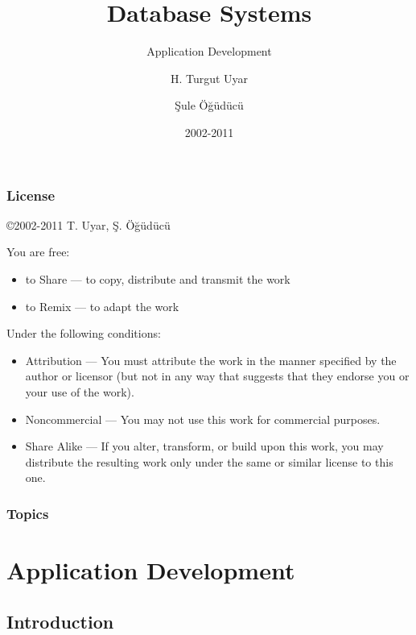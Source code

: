 \documentclass[dvipsnames]{beamer}
\title{Database Systems}
\subtitle{Application Development}
\author{H. Turgut Uyar \and Şule Öğüdücü}
\date{2002-2011}
\theoremstyle{plain}
\begin{document}
\begin{frame}
  \titlepage
\end{frame}

\begin{frame}
  \frametitle{License}

  \hfill
  \copyright 2002-2011 T. Uyar, Ş. Öğüdücü

  \vfill
  \begin{tiny}
    You are free:
    \begin{itemize}
      \item to Share — to copy, distribute and transmit the work
      \item to Remix — to adapt the work
    \end{itemize}

    Under the following conditions:
    \begin{itemize}
      \item Attribution — You must attribute the work in the manner specified by
        the author or licensor (but not in any way that suggests that they
        endorse you or your use of the work).

      \item Noncommercial — You may not use this work for commercial purposes.

      \item Share Alike — If you alter, transform, or build upon this work, you
        may distribute the resulting work only under the same or similar license
        to this one.
    \end{itemize}
  \end{tiny}
\end{frame}

\begin{frame}
  \frametitle{Topics}
  \tableofcontents
\end{frame}

\section{Application Development}

\subsection{Introduction}
\end{document}
